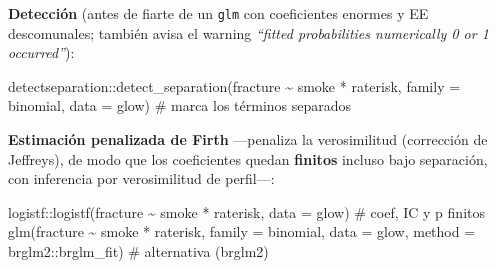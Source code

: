 \documentclass[
  letterpaper,
  DIV=11,
  numbers=noendperiod]{scrartcl}
\newenvironment{Shaded}{\begin{snugshade}}{\end{snugshade}}
\newcommand{\AttributeTok}[1]{\textcolor[rgb]{0.40,0.45,0.13}{#1}}
\newcommand{\CommentTok}[1]{\textcolor[rgb]{0.37,0.37,0.37}{#1}}
\newcommand{\FunctionTok}[1]{\textcolor[rgb]{0.28,0.35,0.67}{#1}}
\newcommand{\NormalTok}[1]{\textcolor[rgb]{0.00,0.23,0.31}{#1}}
\newcommand{\SpecialCharTok}[1]{\textcolor[rgb]{0.37,0.37,0.37}{#1}}
\begin{document}
\begin{tcolorbox}[enhanced jigsaw, breakable, colframe=quarto-callout-tip-color-frame, left=2mm, arc=.35mm, colbacktitle=quarto-callout-tip-color!10!white, toprule=.15mm, colback=white, coltitle=black, rightrule=.15mm, opacitybacktitle=0.6, title=\textcolor{quarto-callout-tip-color}{\faLightbulb}\hspace{0.5em}{🔧 En R. Detectar la separación y estimar por verosimilitud penalizada
(Firth)}, titlerule=0mm, toptitle=1mm, bottomtitle=1mm, leftrule=.75mm, bottomrule=.15mm, opacityback=0]

\textbf{Detección} (antes de fiarte de un \texttt{glm} con coeficientes
enormes y EE descomunales; también avisa el warning \emph{``fitted
probabilities numerically 0 or 1 occurred''}):

\begin{Shaded}
\begin{Highlighting}[]
\NormalTok{detectseparation}\SpecialCharTok{::}\FunctionTok{detect\_separation}\NormalTok{(fracture }\SpecialCharTok{\textasciitilde{}}\NormalTok{ smoke }\SpecialCharTok{*}\NormalTok{ raterisk,}
                                    \AttributeTok{family =}\NormalTok{ binomial, }\AttributeTok{data =}\NormalTok{ glow)   }\CommentTok{\# marca los términos separados}
\end{Highlighting}
\end{Shaded}

\textbf{Estimación penalizada de Firth} ---penaliza la verosimilitud
(corrección de Jeffreys), de modo que los coeficientes quedan
\textbf{finitos} incluso bajo separación, con inferencia por
verosimilitud de perfil---:

\begin{Shaded}
\begin{Highlighting}[]
\NormalTok{logistf}\SpecialCharTok{::}\FunctionTok{logistf}\NormalTok{(fracture }\SpecialCharTok{\textasciitilde{}}\NormalTok{ smoke }\SpecialCharTok{*}\NormalTok{ raterisk, }\AttributeTok{data =}\NormalTok{ glow)            }\CommentTok{\# coef, IC y p finitos}
\FunctionTok{glm}\NormalTok{(fracture }\SpecialCharTok{\textasciitilde{}}\NormalTok{ smoke }\SpecialCharTok{*}\NormalTok{ raterisk, }\AttributeTok{family =}\NormalTok{ binomial, }\AttributeTok{data =}\NormalTok{ glow,}
    \AttributeTok{method =}\NormalTok{ brglm2}\SpecialCharTok{::}\NormalTok{brglm\_fit)                                       }\CommentTok{\# alternativa (brglm2)}
\end{Highlighting}
\end{Shaded}

\end{tcolorbox}
\end{document}
